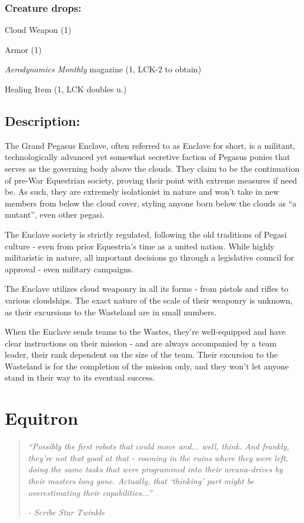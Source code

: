 \documentclass[11pt,a4paper,twocolumn]{book}
\begin{document}
	\vfill
	\subsubsection*{Creature drops:}
	\begin{compactitem}
		\item Cloud Weapon (1)
		\item Armor (1)
		\item \emph{Aerodynamics Monthly} magazine (1, LCK-2 to obtain)
		\item Healing Item (1, LCK doubles u.)
	\end{compactitem}
	
	\subsection*{Description:}
	The Grand Pegasus Enclave, often referred to as Enclave for short, is a militant, technologically advanced yet somewhat secretive faction of Pegasus ponies that serves as the governing body above the clouds. They claim to be the continuation of pre-War Equestrian society, proving their point with extreme measures if need be. As such, they are extremely isolationist in nature and won't take in new members from below the cloud cover, styling anyone born below the clouds as ``a mutant'', even other pegasi. 
	
	The Enclave society is strictly regulated, following the old traditions of Pegasi culture - even from prior Equestria's time as a united nation. While highly militaristic in nature, all important decisions go through a legislative council for approval - even military campaigns.
	
	\bigskip
	The Enclave utilizes cloud weaponry in all its forms - from pistols and rifles to various cloudships. The exact nature of the scale of their weaponry is unknown, as their excursions to the Wasteland are in small numbers. 
	
	When the Enclave sends teams to the Wastes, they're well-equipped and have clear instructions on their mission - and are always accompanied by a team leader, their rank dependent on the size of the team. Their excursion to the Wasteland is for the completion of the mission only, and they won't let anyone stand in their way to its eventual success.
	
	\clearpage
	
	\section*{Equitron}
	\begin{quote}
		\emph{``Possibly the first robots that could move and... well, think. And frankly, they're not that good at that - roaming in the ruins where they were left, doing the same tasks that were programmed into their arcana-drives by their masters long gone. Actually, that `thinking' part might be overestimating their capabilities...''}
		
		\emph{-	Scribe Star Twinkle}
	\end{quote}
	
\end{document}
